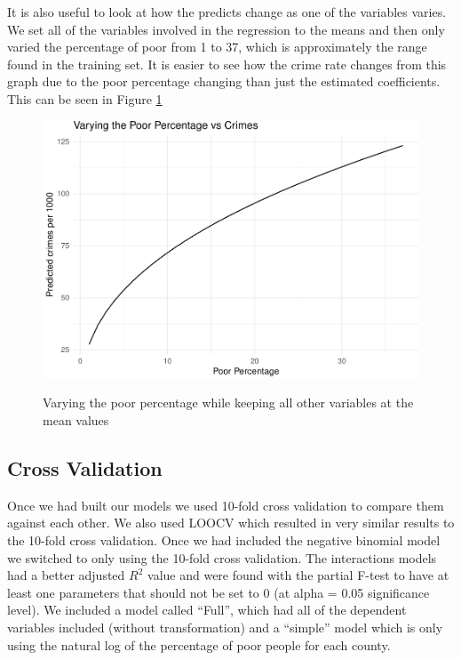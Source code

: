 \documentclass[]{article}
\begin{document}
It is also useful to look at how the predicts change as one of the
variables varies. We set all of the variables involved in the regression
to the means and then only varied the percentage of poor from 1 to 37,
which is approximately the range found in the training set. It is easier
to see how the crime rate changes from this graph due to the poor
percentage changing than just the estimated coefficients. This can be seen in Figure \ref{fig:vary_poor}

\begin{figure}[h!]
\caption{Varying the poor percentage while keeping all other variables at the mean values}
\includegraphics{project_files/figure-latex/unnamed-chunk-12-1.pdf}
\centering
\label{fig:vary_poor}
\end{figure}


\subsection{Cross Validation}\label{cross-validation}

Once we had built our models we used 10-fold cross validation to compare
them against each other. We also used LOOCV which resulted in very
similar results to the 10-fold cross validation. Once we had included
the negative binomial model we switched to only using the 10-fold cross
validation. The interactions models had a better adjusted \(R^2\) value
and were found with the partial F-test to have at least one parameters
that should not be set to 0 (at alpha = 0.05 significance level). We
included a model called ``Full'', which had all of the dependent
variables included (without transformation) and a ``simple'' model which
is only using the natural log of the percentage of poor people for each
county.
\end{document}
